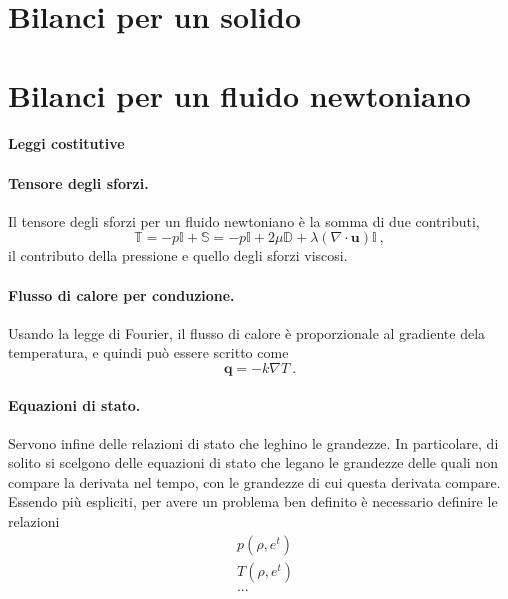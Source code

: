 \section{Bilanci per un solido}

\section{Bilanci per un fluido newtoniano}
\paragraph{Leggi costitutive}
\paragraph{Tensore degli sforzi.}
Il tensore degli sforzi per un fluido newtoniano è la somma di due contributi,
\begin{equation}
    \mathbb{T} = - p \mathbb{I} + \mathbb{S} = -p \mathbb{I} + 2 \mu \mathbb{D} + \lambda (\nabla \cdot \mathbf{u})\mathbb{I} \ ,
\end{equation}
il contributo della pressione e quello degli sforzi viscosi.

\paragraph{Flusso di calore per conduzione.} Usando la legge di Fourier, il flusso di calore è proporzionale al gradiente dela temperatura, e quindi può essere scritto come
\begin{equation}
    \mathbf{q} = - k \nabla T \ .
\end{equation}

\paragraph{Equazioni di stato.} Servono infine delle relazioni di stato che leghino le grandezze. In particolare, di solito si scelgono delle equazioni di stato che legano le grandezze delle quali non compare la derivata nel tempo, con le grandezze di cui questa derivata compare. Essendo più espliciti, per avere un problema ben definito è necessario definire le relazioni
\begin{equation}
\begin{aligned}
    & p(\rho, e^t) \\
    & T(\rho, e^t) \\
    & \dots
\end{aligned}
\end{equation}

